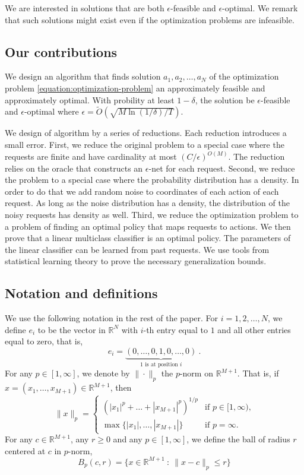 \documentclass[12pt]{article}
\newcommand{\R}{\mathbb{R}}
\theoremstyle{definition}
\begin{document}
We are interested in solutions that are both $\epsilon$-feasible and
$\epsilon$-optimal. We remark that such solutions might exist even if the
optimization problems are infeasible.

\subsection{Our contributions}

We design an algorithm that finds solution $a_1, a_2, \dots, a_N$ of the
optimization problem \eqref{equation:optimization-problem} an approximately
feasible and approximately optimal. With probility at least $1 - \delta$, the
solution be $\epsilon$-feasible and $\epsilon$-optimal where $\epsilon =
\widetilde{O}(\sqrt{M \ln(1/\delta)/T})$.

We design of algorithm by a series of reductions. Each reduction introduces a
small error. First, we reduce the original problem to a special case where the
requests are finite and have cardinality at most $(C/\epsilon)^{O(M)}$. The
reduction relies on the oracle that constructs an $\epsilon$-net for each
request. Second, we reduce the problem to a special case where the probability
distribution has a density. In order to do that we add random noise to
coordinates of each action of each request. As long as the noise distribution
has a density, the distribution of the noisy requests has density as well.
Third, we reduce the optimization problem to a problem of finding an optimal
policy that maps requests to actions. We then prove that a linear multiclass
classifier is an optimal policy. The parameters of the linear classifier can be
learned from past requests. We use tools from statistical learning theory to
prove the necessary generalization bounds.

\subsection{Notation and definitions}
\label{subsection:notation-and-definitions}

We use the following notation in the rest of the paper. For $i=1,2,\dots,N$, we
define $e_i$ to be the vector in $\R^N$ with $i$-th entry equal to $1$ and all
other entries equal to zero, that is,
$$
e_i = \underbrace{(0,\dots,0,1,0,\dots,0)}_{\text{$1$ is at position $i$}} \: .
$$
For any $p \in [1, \infty]$, we denote by $\|\cdot\|_p$ the $p$-norm on $\R^{M+1}$.
That is, if $x = (x_1, \dots, x_{M+1}) \in \R^{M+1}$, then
$$
\|x\|_p =
\begin{cases}
\left(|x_1|^p + \dots + |x_{M+1}|^p\right)^{1/p} & \text{if $p \in [1, \infty)$,}  \\
\max \{|x_1|, \dots, |x_{M+1}|\} & \text{if $p = \infty$.}
\end{cases}
$$
For any $c \in \R^{M+1}$, any $r \ge 0$ and any $p \in [1, \infty]$,
we define the ball of radius $r$ centered at $c$ in $p$-norm,
$$
B_p(c,r) = \{x \in \R^{M+1} ~:~ \|x - c\|_p \le r \}
$$
\end{document}
